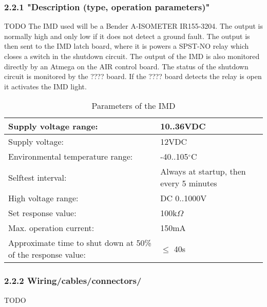 \documentclass{article}
\begin{document}
\subsubsection*{2.2.1 "Description (type, operation parameters)"}

TODO
The IMD used will be a Bender A-ISOMETER IR155-3204. The output is normally high and only low if it does not detect a ground fault. The output is then sent to the IMD latch board, where it is powers a SPST-NO relay which closes a switch in the shutdown circuit. The output of the IMD is also monitored directly by an Atmega on the AIR control board. The status of the shutdown circuit is monitored by the ???? board. If the ???? board detects the relay is  open it activates the IMD light.




\begin{center}
	\begin{table}[H]
		\begin{tabular}{|l|l|}
			\hline
			Supply voltage range: &  10..36VDC \\
			\hline
			Supply voltage: &  12VDC\\
			\hline
			Environmental temperature range: &  -40..105$^{\circ}$C \\
			\hline
			Selftest interval: &  Always at startup, then every 5 minutes \\
			\hline
			High voltage range: &  DC 0..1000V \\
			\hline
			Set response value: &  100k$\Omega$ \\
			\hline
			Max. operation current: &  150mA \\
			\hline
			Approximate time to shut down at 50\% of the response value:&  $\leq$ 40s \\
			\hline
		\end{tabular}
		\caption{Parameters of the IMD}
		\label{IMDParameters}
	\end{table}
\end{center}







\subsubsection*{2.2.2 Wiring/cables/connectors/}
TODO
\end{document}
